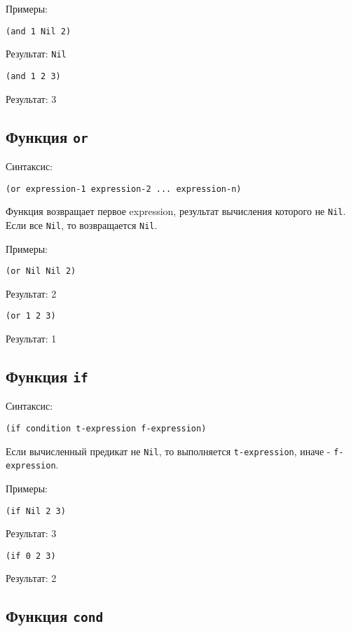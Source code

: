 Примеры:

\begin{lstlisting}
(and 1 Nil 2)
\end{lstlisting}
Результат: \texttt{Nil}

\begin{lstlisting}
(and 1 2 3)
\end{lstlisting}
Результат: 3

\subsection{Функция \texttt{or}}

Синтаксис:
\begin{lstlisting}
(or expression-1 expression-2 ... expression-n)
\end{lstlisting}

Функция возвращает первое expression, результат вычисления которого не \texttt{Nil}. Если все \texttt{Nil}, то возвращается \texttt{Nil}.

Примеры:

\begin{lstlisting}
(or Nil Nil 2)
\end{lstlisting}
Результат: 2

\begin{lstlisting}
(or 1 2 3)
\end{lstlisting}
Результат: 1

\subsection{Функция \texttt{if}}

Синтаксис:
\begin{lstlisting}
(if condition t-expression f-expression)
\end{lstlisting}

Если вычисленный предикат не \texttt{Nil}, то выполняется \texttt{t-expression}, иначе - \texttt{f-expression}.

Примеры:

\begin{lstlisting}
(if Nil 2 3)
\end{lstlisting}
Результат: 3

\begin{lstlisting}
(if 0 2 3)
\end{lstlisting}
Результат: 2

\subsection{Функция \texttt{cond}}

